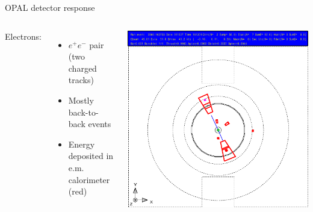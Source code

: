 \documentclass[11pt,xcolor=dvipsnames,professionalfonts]{beamer}
\begin{document}
\begin{frame}{OPAL detector response}
	\begin{columns}
		Electrons:
		\begin{itemize}
			\setlength\itemsep{.5em}
			\item $e^+e^-$ pair (two charged tracks)
			\item Mostly back-to-back events
			\item Energy deposited in e.m. calorimeter (red)
		\end{itemize}
		\includegraphics[width=1.0\textwidth]{./talkfigs/pdf/ee_02.pdf}

	\end{columns}
\end{frame}
\end{document}

